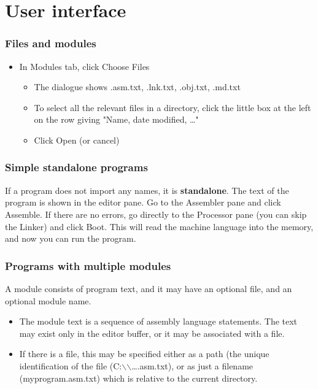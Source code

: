 \documentclass[11pt]{article}
\begin{document}
\section*{User interface}
\label{sec:org99129c0}
\subsubsection*{Files and modules}
\label{sec:org5c29892}
\begin{itemize}
\item In Modules tab, click Choose Files
\begin{itemize}
\item The dialogue shows .asm.txt, .lnk.txt, .obj.txt, .md.txt
\item To select all the relevant files in a directory, click the little
box at the left on the row giving "Name, date modified, \ldots{}"
\item Click Open (or cancel)
\end{itemize}
\end{itemize}
\subsubsection*{Simple standalone programs}
\label{sec:org811b9d7}

If a program does not import any names, it is \textbf{standalone}.  The text
of the program is shown in the editor pane.  Go to the Assembler pane
and click Assemble.  If there are no errors, go directly to the
Processor pane (you can skip the Linker) and click Boot.  This will
read the machine language into the memory, and now you can run the
program.

\subsubsection*{Programs with multiple modules}
\label{sec:orga9be15c}

A module consists of program text, and it may have an optional file,
and an optional module name.

\begin{itemize}
\item The module text is a sequence of assembly language statements.  The
text may exist only in the editor buffer, or it may be associated
with a file.

\item If there is a file, this may be specified either as a path (the
unique identification of the file (C:$\backslash$\Users$\backslash$\ldots{}\prog.asm.txt), or
as just a filename (myprogram.asm.txt) which is relative to the
current directory.
\end{itemize}
\end{document}
